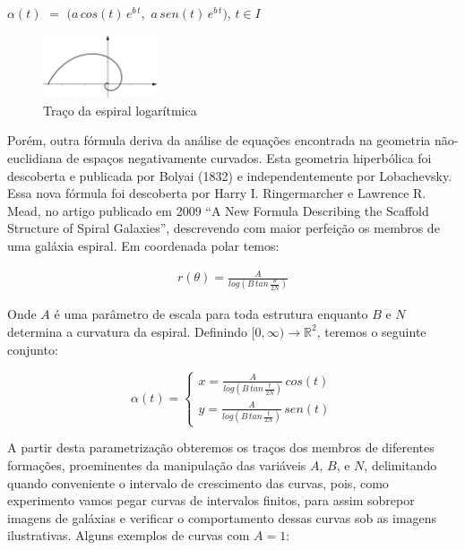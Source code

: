 \documentclass[twoside,a4paper,10pt]{article}
\newcommand{\R}{\mathbb R} %
\begin{document}
\begin{center}
	$\alpha(t)$ $=$ $(a\,cos(t)\,e^{b\,t},$ $a\,sen(t)\,e^{b\,t})$, $t\in I$
\end{center}

\begin{figure}[!h]
	\centering
	\includegraphics[width=0.3\textwidth]{log}
	\caption{Traço da espiral logarítmica}
\end{figure}

Porém, outra fórmula deriva da análise de equações encontrada na geometria não-euclidiana de espaços negativamente curvados. Esta geometria hiperbólica foi descoberta e publicada por Bolyai (1832) e independentemente por Lobachevsky. Essa nova fórmula foi descoberta por Harry I. Ringermarcher e Lawrence R. Mead, no artigo publicado em 2009 “A New Formula Describing the Scaffold Structure of Spiral Galaxies”, descrevendo com maior perfeição os membros de uma galáxia espiral. Em coordenada polar temos:

\begin{align*}
	r(\theta) = \frac{A}{log\left(B\,tan\,\frac{\theta}{2N}\right)}
\end{align*}
 
Onde $A$ é uma parâmetro de escala para toda estrutura enquanto $B$ e $N$ determina a curvatura da espiral. Definindo $[0, \infty) \rightarrow \R^2$, teremos o seguinte conjunto:

\begin{equation} \label{eq2}
	\alpha(t) = \begin{cases}
		x = \frac{A}{log\left(B\,tan\,\frac{t}{2N}\right)}\,cos(t) \\
		y = \frac{A}{log\left(B\,tan\,\frac{t}{2N}\right)}\,sen(t)
	\end{cases} 
\end{equation}

A partir desta parametrização obteremos os traços dos membros de diferentes formações, proeminentes da manipulação das variáveis $A$, $B$, e $N$, delimitando quando conveniente o intervalo de crescimento das curvas, pois, como experimento vamos pegar curvas de intervalos finitos, para assim sobrepor imagens de galáxias e verificar o comportamento dessas curvas sob as imagens ilustrativas. Alguns exemplos de curvas com $A = 1$:
\end{document}
